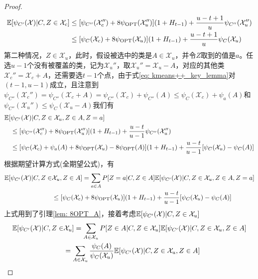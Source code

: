 \begin{proof}
\begin{align}
        \mathbb{E}[\psi_{C'}(\mathcal{X})|C,Z \in \mathcal{X}_c] &\leq [\psi_{C''}(\mathcal{X}_c'')+8\psi_{\text{OPT}}(\mathcal{X}_u'')](1+H_{t-1}) + \frac{u-t+1}{u} \psi_{C''}(\mathcal{X}_u'') \\
        & \leq [\psi_{C}(\mathcal{X}_c)+8\psi_{\text{OPT}}(\mathcal{X}_u)](1+H_{t-1}) + \frac{u-t+1}{u} \psi_{C}(\mathcal{X}_u)
    \end{align}
    第二种情况，$Z \in \mathcal{X}_u$，此时，假设被选中的类是$A \in \mathcal{X}_u$，并令$Z$取到的值是$a$。任选$u-1$个没有被覆盖的类，记为$\mathcal{X}_u''$，取$\mathcal{X}_u'' = \mathcal{X}_u - A$，对应的其他类$\mathcal{X}_c'' = \mathcal{X}_c + A$，还需要选$t-1$个点，由于式\ref{eq: kmeans++_key_lemma}对$(t-1,u-1)$成立，且注意到$\psi_{C''}(\mathcal{X}_c'') = \psi_{C''}(\mathcal{X}_c + A) = \psi_{C''}(\mathcal{X}_c) + \psi_{C''}(A) \leq \psi_{C}(\mathcal{X}_c) + \psi_{a}(A)$和$\psi_{C''}(\mathcal{X}_u'') \leq \psi_{C}(\mathcal{X}_u - A)$我们有
    \begin{align}
        \mathbb{E}[& \psi_{C'}(\mathcal{X})|C, Z \in \mathcal{X}_u, Z \in A, Z=a] \\
        &\leq [\psi_{C''}(\mathcal{X}_c'')+8\psi_{\text{OPT}}(\mathcal{X}_u'')](1+H_{t-1}) + \frac{u-t}{u-1} \psi_{C''}(\mathcal{X}_u'') \\
        &\leq [\psi_{C}(\mathcal{X}_c)+\psi_a(A)+8\psi_{\text{OPT}}(\mathcal{X}_u)-8\psi_{\text{OPT}}(A)](1+H_{t-1}) + \frac{u-t}{u-1}[\psi_C(\mathcal{X}_u)-\psi_C(A)]
    \end{align}
    根据期望计算方式(全期望公式)，有
    \begin{align}
        \mathbb{E}[\psi_{C'}(\mathcal{X})|C, Z \in & \mathcal{X}_u, Z \in A] =
            \sum_{a \in A} P[Z = a|C,Z \in A] \mathbb{E}[\psi_{C'}(\mathcal{X})|C, Z \in \mathcal{X}_u, Z \in A, Z=a] \\
            &\leq [\psi_{C}(\mathcal{X}_c)+8\psi_{\text{OPT}}(\mathcal{X}_u)](1+H_{t-1}) + \frac{u-t}{u-1}[\psi_C(\mathcal{X}_u)-\psi_C(A)]
    \end{align}
    上式用到了引理\ref{lem: 8OPT_A}，接着考虑$\mathbb{E}[\psi_{C'}(\mathcal{X})|C, Z \in \mathcal{X}_u]$
    \begin{align}
        \E[\psi_{C'}(\mathcal{X})|C, Z \in & \mathcal{X}_u] =
            \sum_{A \in \mathcal{X}_u} P[Z \in A|C, Z \in \mathcal{X}_u] \E[\psi_{C'}(\mathcal{X})|C, Z \in \mathcal{X}_u, Z \in A] \\
            &= \sum_{A \in \mathcal{X}_u} \frac{\psi_C(A)}{\psi_C(\mathcal{X}_u)} \E[\psi_{C'}(\mathcal{X})|C, Z \in \mathcal{X}_u, Z \in A] \\

\end{align}
\end{proof}
